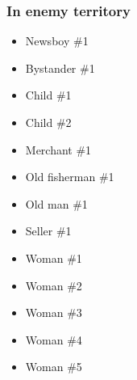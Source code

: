 \subsubsection*{In enemy territory}
\begin{itemize}
	\item Newsboy \#{}1
	\item Bystander \#{}1
	\item Child \#{}1
	\item Child \#{}2
	\item Merchant \#{}1
	\item Old fisherman \#{}1
	\item Old man \#{}1
	\item Seller \#{}1
	\item Woman \#{}1
	\item Woman \#{}2
	\item Woman \#{}3
	\item Woman \#{}4
	\item Woman \#{}5
\end{itemize}
